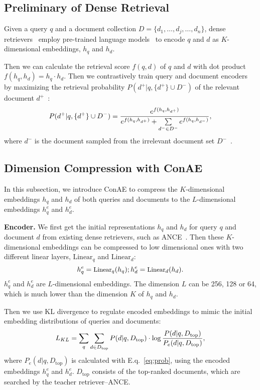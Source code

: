 \documentclass[11pt]{article}
\begin{document}
\subsection{Preliminary of Dense Retrieval}\label{model:preliminary}
Given a query $q$ and a document collection $D=\{d_1,\dots,d_j,\dots,d_n\}$, dense retrievers~\cite{xiong2020dense,xiong2020approximate,karpukhin2020dense} employ pre-trained language models~\cite{devlin2019bert,liu2019roberta} to encode $q$ and $d$ as $K$-dimensional embeddings, $h_q$ and $h_d$.

Then we can calculate the retrieval score $f(q,d)$ of $q$ and $d$ with dot product $f(h_q,h_d)=h_q \cdot h_d$. Then we contrastively train query and document encoders by maximizing the retrieval probability $P(d^+|q, \{d^+\} \cup D^-)$ of the relevant document $d^+$~\cite{xiong2020dense,xiong2020approximate}:
\begin{equation}\small
\label{eq:prob}
      P(d^+|q, \{d^+\} \cup D^-) = \frac{e^{f(h_q,h_{d^+})}}{e^{f(h_q,h_{d^+})} + \sum\limits_{d^-\in D^-}{e^{f(h_q,h_{d^-})}}},
\end{equation}
where $d^-$ is the document sampled from the irrelevant document set $D^-$~\cite{karpukhin2020dense,xiong2020approximate}.


\subsection{Dimension Compression with ConAE}\label{model:autoencoder}
In this subsection, we introduce ConAE to compress the $K$-dimensional embeddings $h_q$ and $h_d$ of both queries and documents to the $L$-dimensional embeddings $h_q^e$ and $h_d^e$.

\textbf{Encoder.} We first get the initial representations $h_q$ and $h_d$ for query $q$ and document $d$ from existing dense retrievers, such as ANCE~\cite{xiong2020approximate}. Then these $K$-dimensional embeddings can be compressed to low dimensional ones with two different linear layers, $\text{Linear}_q$ and $\text{Linear}_d$:
\begin{equation}
\small
     h_q^e = \text{Linear}_q(h_q); h_d^e = \text{Linear}_d(h_d).
\end{equation}
$h_q^e$ and $h_d^e$ are $L$-dimensional embeddings. The dimension $L$ can be 256, 128 or 64, which is much lower than the dimension $K$ of $h_q$ and $h_d$.  

Then we use KL divergence to regulate encoded embeddings to mimic the initial embedding distributions of queries and documents:
\begin{equation}\label{eq:kl}
\small
    L_{KL}  =  \sum\limits_{q}{\sum_{d \in D_{\text{top}}} P(d|q, D_{\text{top}}) \cdot \log  \frac{P(d|q, D_{\text{top}})}{P_e(d|q, D_{\text{top}} )}},
\end{equation}
where $P_e(d|q, D_{\text{top}})$ is calculated with E.q.~\ref{eq:prob}, using the encoded embeddings $h_q^e$ and $h_d^e$. $D_{\text{top}}$ consists of the top-ranked documents, which are searched by the teacher retriever--ANCE.
 
\end{document}
